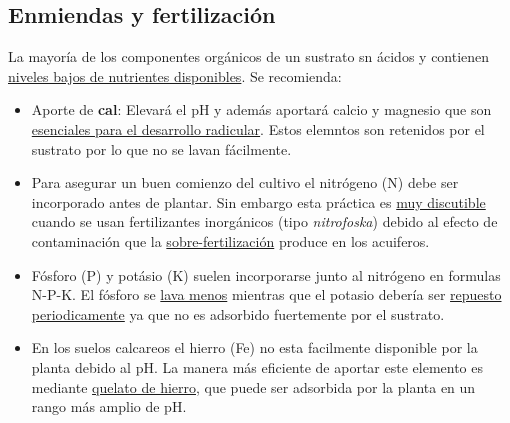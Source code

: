 \documentclass[a4paper,12pt,oneside]{article}
\begin{document}
\subsection{Enmiendas y fertilización}
\label{sec:org3a8642e}
La mayoría de los componentes orgánicos de un sustrato sn ácidos y contienen
\uline{niveles bajos de nutrientes disponibles}. Se recomienda:
\begin{itemize}
\item Aporte de \textbf{cal}: Elevará el pH y además aportará calcio y magnesio que son
\uline{esenciales para el desarrollo radicular}. Estos elemntos son retenidos por el
sustrato por lo que no se lavan fácilmente.
\item Para asegurar un buen comienzo del cultivo el nitrógeno (N) debe ser incorporado
antes de plantar. Sin embargo esta práctica es \uline{muy discutible} cuando se usan
fertilizantes inorgánicos (tipo \emph{nitrofoska}) debido al efecto de
contaminación que la \uline{sobre-fertilización} produce en los acuiferos.
\item Fósforo (P) y potásio (K) suelen incorporarse junto al nitrógeno en formulas
N-P-K. El fósforo se \uline{lava menos} mientras que el potasio debería ser
\uline{repuesto periodicamente} ya que no es adsorbido fuertemente por el sustrato.
\item En los suelos calcareos el hierro (Fe) no esta facilmente disponible por la
planta debido al pH. La manera más eficiente de aportar este elemento es
mediante \uline{quelato de hierro}, que puede ser adsorbida por la planta en un
rango más amplio de pH.
\end{itemize}
\end{document}

